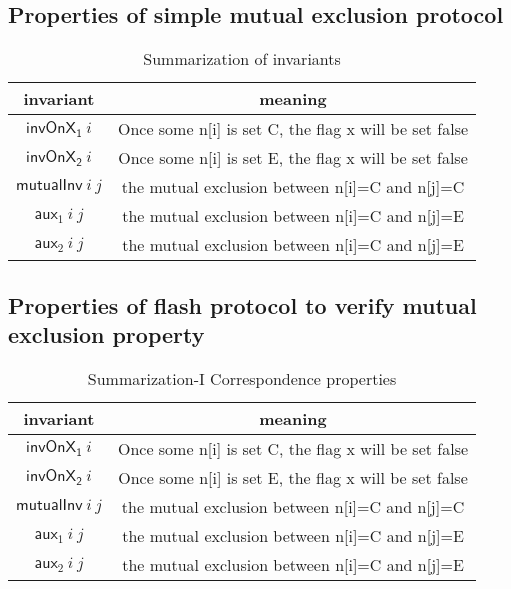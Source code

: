 \documentclass{llncs}
\begin{document}
\subsection{Properties of simple mutual exclusion protocol}
\begin{table}[htbp] \label{Summarization of invariants}
\centering \caption{Summarization of invariants}
\begin{tabular}{|c|c| }
\hline
invariant &  meaning  \\
\hline
$\mathsf{invOnX_1} ~i$& Once some n[i] is set C, the flag x will be set false \\
\hline
$\mathsf{invOnX_2} ~i$&  Once some n[i] is set E, the flag x will be set false \\
\hline
$\mathsf{mutualInv}~ i ~j$ &  the mutual exclusion between n[i]=C and n[j]=C \\
\hline
$\mathsf{aux}_1~ i ~j$ &  the mutual exclusion between n[i]=C and n[j]=E \\
\hline
$\mathsf{aux}_2~ i ~j$ &  the mutual exclusion between n[i]=C and n[j]=E \\
\hline
\end{tabular}
\end{table}


\subsection{Properties of flash protocol to verify mutual exclusion property}
\begin{table}[htbp] \label{Summarization1-Corresponence}
\centering \caption{Summarization-I Correspondence properties}
\begin{tabular}{|c|c| }
\hline
invariant &  meaning  \\
\hline
$\mathsf{invOnX_1} ~i$& Once some n[i] is set C, the flag x will be set false \\
\hline
$\mathsf{invOnX_2} ~i$&  Once some n[i] is set E, the flag x will be set false \\
\hline
$\mathsf{mutualInv}~ i ~j$ &  the mutual exclusion between n[i]=C and n[j]=C \\
\hline
$\mathsf{aux}_1~ i ~j$ &  the mutual exclusion between n[i]=C and n[j]=E \\
\hline
$\mathsf{aux}_2~ i ~j$ &  the mutual exclusion between n[i]=C and n[j]=E \\
\hline
\end{tabular}
\end{table}
\end{document}
